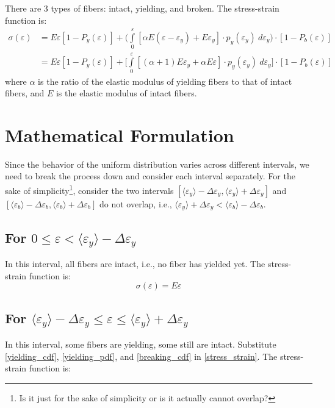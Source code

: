\documentclass{article}
\newcommand{\eps}{\varepsilon}
\newcommand{\avg}[1]{\langle #1 \rangle}
\newcommand{\dey}{\Delta \varepsilon_y}
\newcommand{\deb}{\Delta \varepsilon_b}
\begin{document}
There are 3 types of fibers: intact, yielding, and broken. The stress-strain function is:
\begin{align}
    \sigma(\eps) &= E \eps [1 - P_y(\eps)] + \bigg(\int\limits_0^\eps [\alpha E (\eps - \eps_y) + E \eps_y] \cdot p_y(\eps_y) ~ d\eps_y \bigg)\cdot [1 - P_b(\eps)] \\
    &= E \eps [ 1 - P_y(\eps) ] + \Bigg[\int\limits_0^\eps [(\alpha + 1) E \eps_y + \alpha E \eps] \cdot p_y(\eps_y) ~ d\eps_y \Bigg]\cdot [1 - P_b(\eps)]
\label{stress_strain}
\end{align}
where $\alpha$ is the ratio of the elastic modulus of yielding fibers to that of intact fibers, and $E$ is the elastic modulus of intact fibers.


\section{Mathematical Formulation}

Since the behavior of the uniform distribution varies across different intervals, we need to break the process down and consider each interval separately. For the sake of simplicity\footnote{Is it just for the sake of simplicity or is it actually cannot overlap?}, consider the two intervals $[\avg{\eps_y} - \dey, \avg{\eps_y} + \dey]$ and $[\avg{\eps_b} - \deb, \avg{\eps_b} + \deb]$ do not overlap, i.e., $\avg{\eps_y} + \dey < \avg{\eps_b} - \deb$.


\subsection{For $0 \leq \eps < \avg{\eps_y} - \dey$}

\indent 
In this interval, all fibers are intact, i.e., no fiber has yielded yet. The stress-strain function is:
\begin{equation}
    \sigma(\eps) = E \eps
\end{equation}
\subsection{For $\avg{\eps_y} - \dey \leq \eps \leq \avg{\eps_y} + \dey$}
In this interval, some fibers are yielding, some still are intact. Substitute \eqref{yielding_cdf}, \eqref{yielding_pdf}, and \eqref{breaking_cdf} in \eqref{stress_strain}. The stress-strain function is:
\end{document}
